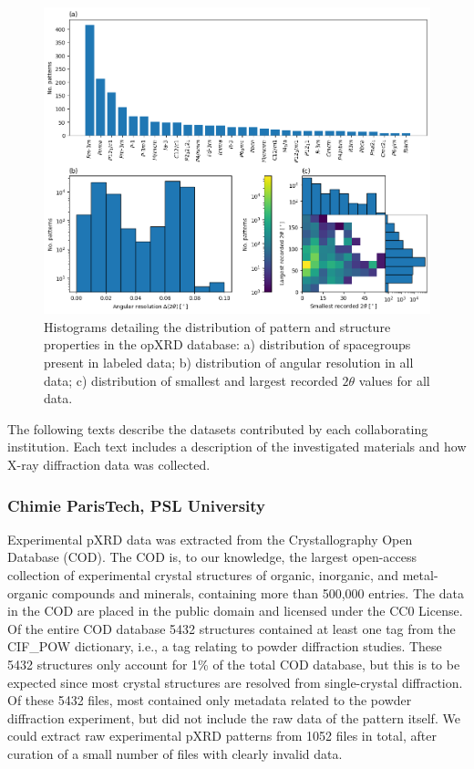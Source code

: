 \begin{figure}[!htb]
    \centering
    \includegraphics[width=0.8\linewidth]{figures/hist.png}
    \caption{Histograms detailing the distribution of pattern and structure properties in the opXRD database: a) distribution of spacegroups present in labeled data; b) distribution of angular resolution in all data; c) distribution of smallest and largest recorded $2\theta$ values for all data.}
    \label{fig:histograms}
\end{figure}

The following texts describe the datasets contributed by each collaborating institution. Each text includes a description of the investigated materials and how X-ray diffraction data was collected.

\subsubsection*{Chimie ParisTech, PSL University}

Experimental pXRD data was extracted from the Crystallography Open Database (COD)\cite{Grazulis2009, Vaitkus2023}. The COD is, to our knowledge, the largest open-access collection of experimental crystal structures of organic, inorganic, and metal-organic compounds and minerals, containing more than 500,000 entries. The data in the COD are placed in the public domain and licensed under the CC0 License. Of the entire COD database 5432 structures contained at least one tag from the {CIF\_POW} dictionary, i.e., a tag relating to powder diffraction studies. These 5432 structures only account for 1\% of the total COD database, but this is to be expected since most crystal structures are resolved from single-crystal diffraction. Of these 5432 files, most contained only metadata related to the powder diffraction experiment, but did not include the raw data of the pattern itself. We could extract raw experimental pXRD patterns from 1052 files in total, after curation of a small number of files with clearly invalid data. \\

